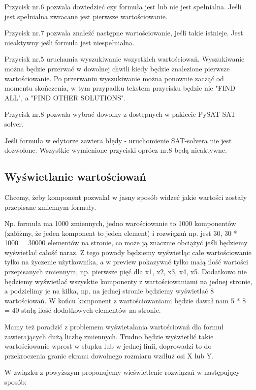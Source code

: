 \documentclass[a4paper,12pt,oneside]{book}
\theoremstyle{definition}
\begin{document}
Przycisk nr.6 pozwala dowiedzieć czy formuła jest lub nie jest spełnialna. Jeśli jest spełnialna zwracane jest pierwsze wartościowanie.

Przycisk nr.7 pozwala znaleźć następne wartościowanie, jeśli takie istnieje. Jest nieaktywny jeśli formula jest niespełnialna.

Przycisk nr.5 uruchamia wyszukiwanie wszystkich wartościowań. Wyszukiwanie można będzie przerwać w dowolnej chwili kiedy będzie znalezione pierwsze wartościowanie. Po przerwaniu wyszukiwanie można ponownie zacząć od momentu skończenia, w tym przypadku tekstem przycisku będzie nie "FIND ALL", a "FIND OTHER SOLUTIONS".

Przycisk nr.8 pozwala wybrać dowolny z dostępnych w pakiecie PySAT SAT-solver.

Jeśli formuła w edytorze zawiera błędy - uruchomienie SAT-solvera nie jest dozwolone. Wszystkie wymienione przyciski oprócz nr.8 będą nieaktywne.

\newpage

\subsection{Wyświetlanie wartościowań}

Chcemy, żeby komponent pozwalał w jasny sposób widzeć jakie wartości zostały przepisane zmiennym formuły. 

Np. formuła ma 1000 zmiennych, jedno warościowanie to 1000 komponentów (załóżmy, że jeden komponent to jeden element) i rozwiązań np. jest 30, 30 * 1000 = 30000 elementów na stronie, co może ją znacznie obciążyć jeśli będziemy wyświetlać całość naraz. Z tego powody będziemy wyświetląc całe wartościowanie tylko na życzenie użytkownika, a w preview pokazywać tylko małą ilość wartości przepisanych zmiennym, np. pierwsze pięć dla x1, x2, x3, x4, x5. Dodatkowo nie będziemy wyświetlać wszysktie komponenty z wartościowaniami na jednej stronie, a podzielimy je na kilka, np. na jednej stronie będziemy wyświetlać 8 wartościowań. W końcu komponent z wartościowaniami będzie dawał nam 5 * 8 = 40 stałą ilość dodatkowych elementów na stronie.

Mamy też poradzić z problemem wyświetalania wartościowań dla formuł zawierających dużą liczbę zmiennych. Trudno będzie wyświetlić takie wartościowanie wprost w słupku lub w jednej linii, doprowadzi to do przekroczenia granic ekranu dowolnego rozmiaru wzdłuż osi X lub Y. 

W związku z powyższym proponujemy wieświetlenie rozwiązań w następujący sposób:
\end{document}
